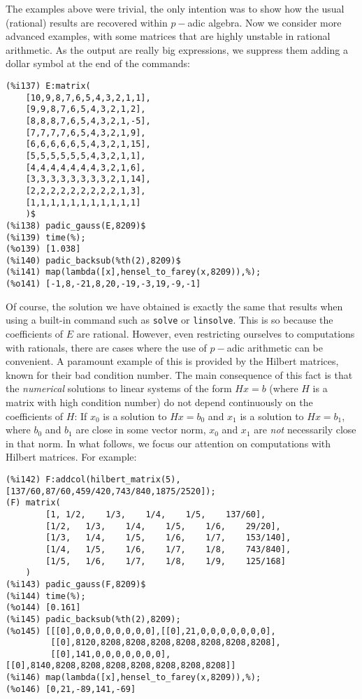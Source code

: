 \documentclass[fleqn]{cas-sc}
\begin{document}
The examples above were trivial, the only intention was to show
	how the usual (rational) results are recovered within $p-$adic algebra.
	Now we consider more advanced examples, with some matrices that
	are highly unstable in rational arithmetic. As the output are really
	big expressions, we suppress them adding a dollar symbol at the end of the commands:
	
\begin{verbatim}
(%i137)	E:matrix(
	[10,9,8,7,6,5,4,3,2,1,1],
	[9,9,8,7,6,5,4,3,2,1,2],
	[8,8,8,7,6,5,4,3,2,1,-5],
	[7,7,7,7,6,5,4,3,2,1,9],
	[6,6,6,6,6,5,4,3,2,1,15],
	[5,5,5,5,5,5,4,3,2,1,1],
	[4,4,4,4,4,4,4,3,2,1,6],
	[3,3,3,3,3,3,3,3,2,1,14],
	[2,2,2,2,2,2,2,2,2,1,3],
	[1,1,1,1,1,1,1,1,1,1,1]
	)$
(%i138)	padic_gauss(E,8209)$
(%i139)	time(%);
(%o139)	[1.038]
(%i140)	padic_backsub(%th(2),8209)$
(%i141)	map(lambda([x],hensel_to_farey(x,8209)),%);
(%o141)	[-1,8,-21,8,20,-19,-3,19,-9,-1]
\end{verbatim}
Of course, the solution we have obtained is exactly the same that results
when using a built-in command such as \texttt{solve} or \texttt{linsolve}.
This is so because the coefficients of $E$ are rational. However, even 
restricting ourselves to computations with rationals, there are cases where
the use of $p-$adic arithmetic can be convenient. A paramount example of this
is provided by the Hilbert matrices, known for their bad condition number.
The main consequence of this fact is that the \emph{numerical} solutions to
linear systems of the form $Hx=b$ (where $H$ is a matrix with high condition
number) do not depend continuously on the coefficients of $H$: If $x_0$ is
a solution to $Hx=b_0$ and $x_1$ is a solution to $Hx=b_1$, where $b_0$ and $b_1$
are close in some vector norm, $x_0$ and $x_1$ are \emph{not} necessarily close in
that norm.
In what follows, we focus our attention on computations with Hilbert matrices.
For example:
\begin{verbatim}
(%i142)	F:addcol(hilbert_matrix(5),[137/60,87/60,459/420,743/840,1875/2520]);
(F)	matrix(
		[1,	1/2,	1/3,	1/4,	1/5,	137/60],
		[1/2,	1/3,	1/4,	1/5,	1/6,	29/20],
		[1/3,	1/4,	1/5,	1/6,	1/7,	153/140],
		[1/4,	1/5,	1/6,	1/7,	1/8,	743/840],
		[1/5,	1/6,	1/7,	1/8,	1/9,	125/168]
	)
(%i143)	padic_gauss(F,8209)$
(%i144)	time(%);
(%o144)	[0.161]
(%i145)	padic_backsub(%th(2),8209);
(%o145)	[[[0],0,0,0,0,0,0,0,0],[[0],21,0,0,0,0,0,0,0],
         [[0],8120,8208,8208,8208,8208,8208,8208,8208],
         [[0],141,0,0,0,0,0,0,0],[[0],8140,8208,8208,8208,8208,8208,8208,8208]]
(%i146)	map(lambda([x],hensel_to_farey(x,8209)),%);
(%o146)	[0,21,-89,141,-69]
\end{verbatim}
\end{document}
